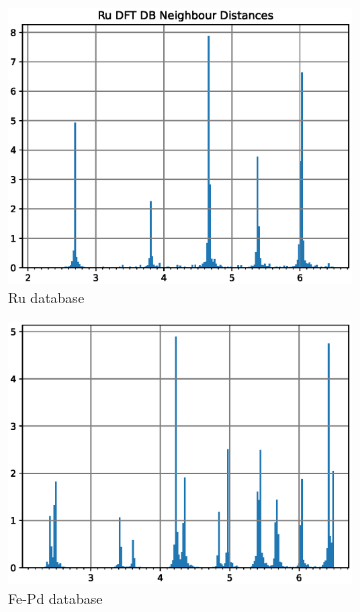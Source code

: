 \begin{figure}
\begin{subfigure}{.49\textwidth}
  \centering
  \includegraphics[width=.99\linewidth]{chapters/potentials_fe_pd_ru/neighbour_distances/db_ru_neighbours.eps}  
  \caption{Ru database}
  \label{fig:rudb}
\end{subfigure}
\begin{subfigure}{.49\textwidth}
  \centering
  \includegraphics[width=.99\linewidth]{chapters/potentials_fe_pd_ru/neighbour_distances/db_fepd_neighbours.eps}  
  \caption{Fe-Pd database}
  \label{fig:fepddb}
\end{subfigure}
\begin{subfigure}{.49\textwidth}
  \centering

\end{subfigure}
\end{figure}
